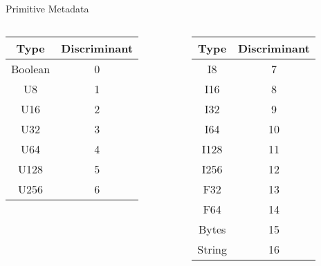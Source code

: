 \documentclass{beamer}
\begin{document}
\begin{frame}{Primitive Metadata}
	\begin{columns}
		\begin{column}{0.5\textwidth}
			\center
			\begin{tabular}{|c|c|}
				\hline
				\textbf{Type} & \textbf{Discriminant} \\
				\hline
				Boolean       & 0                     \\
				U8            & 1                     \\
				U16           & 2                     \\
				U32           & 3                     \\
				U64           & 4                     \\
				U128          & 5                     \\
				U256          & 6                     \\
				\hline
			\end{tabular}
		\end{column}
		\begin{column}{0.5\textwidth}
			\center
			\begin{tabular}{|c|c|}
				\hline
				\textbf{Type} & \textbf{Discriminant} \\
				\hline
				I8            & 7                     \\
				I16           & 8                     \\
				I32           & 9                     \\
				I64           & 10                    \\
				I128          & 11                    \\
				I256          & 12                    \\
				F32           & 13                    \\
				F64           & 14                    \\
				Bytes         & 15                    \\
				String        & 16                    \\
				\hline
			\end{tabular}
		\end{column}
	\end{columns}
\end{frame}
\end{document}
